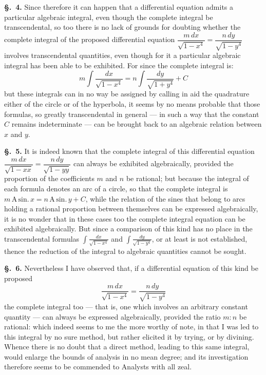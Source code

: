 \documentclass{article}
\begin{document}
\textbf{§.~4.} Since therefore it can happen that a differential equation admits a particular
algebraic integral, even though the complete integral be transcendental, so too there is no lack of
grounds for doubting whether the complete integral of the proposed differential equation
$\dfrac{m\,dx}{\sqrt{1-x^{4}}} = \dfrac{n\,dy}{\sqrt{1-y^{4}}}$ involves transcendental quantities,
even though for it a particular algebraic integral has been able to be exhibited. For since the
complete integral is:
\[ m\int \frac{dx}{\sqrt{1-x^{4}}} = n\int \frac{dy}{\sqrt{1+y^{4}}} + C \]
but these integrals can in no way be assigned by calling in aid the quadrature either of the circle
or of the hyperbola, it seems by no means probable that those formulas, so greatly transcendental in
general — in such a way that the constant $C$ remains indeterminate — can be brought back to an
algebraic relation between $x$ and $y$.

\textbf{§.~5.} It is indeed known that the complete integral of this differential equation
$\dfrac{m\,dx}{\sqrt{1-xx}} = \dfrac{n\,dy}{\sqrt{1-yy}}$ can always be exhibited algebraically,
provided the proportion of the coefficients $m$ and $n$ be rational; but because the integral of
each formula denotes an arc of a circle, so that the complete integral is
$m\,\mathrm{A}\,\mathrm{sin.}\,x = n\,\mathrm{A}\,\mathrm{sin.}\,y + C$, while the relation of the
sines that belong to arcs holding a rational proportion between themselves can be expressed
algebraically, it is no wonder that in these cases too the complete integral equation can be
exhibited algebraically. But since a comparison of this kind has no place in the transcendental
formulas $\displaystyle\int \frac{dx}{\sqrt{1-x^{4}}}$ and
$\displaystyle\int \frac{dy}{\sqrt{1-y^{4}}}$, or at least is not
established, thence the reduction of the integral to algebraic quantities cannot be sought.

\textbf{§.~6.} Nevertheless I have observed that, if a differential equation of this kind be proposed
\[ \frac{m\,dx}{\sqrt{1-x^{4}}} = \frac{n\,dy}{\sqrt{1-y^{4}}} \]
the complete integral too — that is, one which involves an arbitrary constant quantity — can always
be expressed algebraically, provided the ratio $m:n$ be rational: which indeed seems to me the more
worthy of note, in that I was led to this integral by no sure method, but rather elicited it by
trying, or by divining. Whence there is no doubt that a direct method, leading to this same
integral, would enlarge the bounds of analysis in no mean degree; and its investigation therefore
seems to be commended to Analysts with all zeal.
\end{document}
